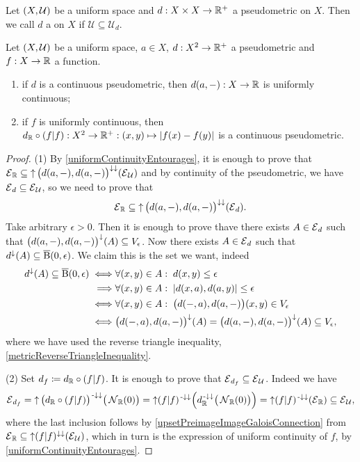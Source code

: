 \begin{definition}
Let $\sSet{X, \mathcal{U}}$ be a uniform space and $d: X\times X\to \mathbb{R}^+$ a pseudometric on $X$. Then we call $d$ a  on $X$ if $\mathcal{U}\subseteq \mathcal{U}_d$.
\end{definition}

\begin{proposition} \label{continuousPseudometricFunctionLemma}
Let $\sSet{X, \mathcal{U}}$ be a uniform space, $a\in X$, $d: X^2\to \mathbb{R}^+$ a pseudometric and $f: X\to \mathbb{R}$ a function.
\begin{enumerate}
\item if $d$ is a continuous pseudometric, then $d(a, -): X\to \mathbb{R}$ is uniformly continuous;
\item if $f$ is uniformly continuous, then $d_{\mathbb{R}}\circ (f|f): X^2\to \mathbb{R}^+: (x,y)\mapsto |f(x)- f(y)|$ is a continuous pseudometric.
\end{enumerate}
\end{proposition}
\begin{proof}
(1) By \ref{uniformContinuityEntourages}, it is enough to prove that $\operatorname{\mathcal{E}}_{\mathbb{R}} \subseteq \operatorname{\uparrow} \big(d(a, -), d(a,-)\big)^{\downarrow\downarrow}(\operatorname{\mathcal{E}}_\mathcal{U})$ and by continuity of the pseudometric, we have $\operatorname{\mathcal{E}}_d \subseteq \operatorname{\mathcal{E}}_{\mathcal{U}}$, so we need to prove that
\[ \operatorname{\mathcal{E}}_{\mathbb{R}} \subseteq \operatorname{\uparrow} \big(d(a, -), d(a,-)\big)^{\downarrow\downarrow}(\operatorname{\mathcal{E}}_d). \]
Take arbitrary $\epsilon>0$. Then it is enough to prove thave there exists $A\in \operatorname{\mathcal{E}}_d$ such that $\big(d(a, -), d(a,-)\big)^{\downarrow}(A) \subseteq V_\epsilon$. Now there exists $A\in \operatorname{\mathcal{E}}_d$ such that $d^{\downarrow}(A)\subseteq \operatorname{\overline{B}}(0,\epsilon)$. We claim this is the set we want, indeed
\begin{align*}
d^{\downarrow}(A)\subseteq \operatorname{\overline{B}}(0,\epsilon) \iff& \forall (x,y)\in A: \; d(x,y) \leq \epsilon \\
\implies& \forall (x,y)\in A: \; |d(x,a), d(a,y)| \leq \epsilon \\
\iff& \forall (x,y)\in A: \; \big(d(-,a), d(a,-)\big)(x,y) \in V_\epsilon \\
\iff& \big(d(-,a), d(a,-)\big)^\downarrow(A) = \big(d(a,-), d(a,-)\big)^\downarrow(A) \subseteq V_\epsilon,
\end{align*}
where we have used the reverse triangle inequality, \ref{metricReverseTriangleInequality}.

(2) Set $d_f \coloneqq d_{\mathbb{R}}\circ(f|f)$. It is enough to prove that $\operatorname{\mathcal{E}}_{d_f}\subseteq \operatorname{\mathcal{E}}_\mathcal{U}$. Indeed we have
\[ \operatorname{\mathcal{E}}_{d_f} = \operatorname{\uparrow} \big(d_{\mathbb{R}}\circ (f|f)\big)^{{\text{\hspace{0.15em}-}\downarrow}\downarrow}\big(\operatorname{\mathcal{N}}_{\mathbb{R}}(0)\big) = \operatorname{\uparrow} (f|f)^{{\text{\hspace{0.15em}-}\downarrow}\downarrow}\Big(d_{\mathbb{R}}^{{\text{\hspace{0.15em}-}\downarrow}\downarrow}\big(\operatorname{\mathcal{N}}_{\mathbb{R}}(0)\big)\Big) = \operatorname{\uparrow} (f|f)^{{\text{\hspace{0.15em}-}\downarrow}\downarrow}(\operatorname{\mathcal{E}}_{\mathbb{R}}) \subseteq \operatorname{\mathcal{E}}_\mathcal{U}, \]
where the last inclusion follows by \ref{upsetPreimageImageGaloisConnection} from $\operatorname{\mathcal{E}}_{\mathbb{R}} \subseteq \operatorname{\uparrow} (f|f)^{\downarrow\downarrow}(\operatorname{\mathcal{E}}_\mathcal{U})$, which in turn is the expression of uniform continuity of $f$, by \ref{uniformContinuityEntourages}.
\end{proof}

